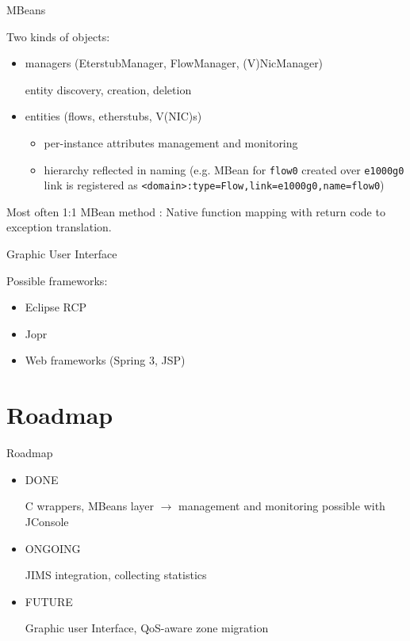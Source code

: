 \documentclass{beamer}
\begin{document}
		\begin{frame}{MBeans}

			Two kinds of objects:
			
			\begin{itemize}

				\item managers (EterstubManager, FlowManager, (V)NicManager)

					entity discovery, creation, deletion

				\item entities (flows, etherstubs, V(NIC)s)

					\begin{itemize}
						\item per-instance attributes management and monitoring
						\item hierarchy reflected in naming (e.g. MBean for \texttt{flow0}
						      created over \texttt{e1000g0} link is registered as \texttt{<domain>:type=Flow,link=e1000g0,name=flow0})
					\end{itemize}
			
			\end{itemize}

			Most often 1:1 MBean method : Native function mapping with return code to exception translation.

		\end{frame}


		\begin{frame}{Graphic User Interface}

				Possible frameworks:

				\begin{itemize}
					\item Eclipse RCP
					\item Jopr
					\item Web frameworks (Spring 3, JSP)
				\end{itemize}

		\end{frame}


\section{Roadmap}

	\begin{frame}{Roadmap}
		
		\begin{itemize}

			\item DONE
			
				C wrappers, MBeans layer $\rightarrow$ management and monitoring possible with JConsole

			\item ONGOING
			
				JIMS integration, collecting statistics

			\item FUTURE
			
				Graphic user Interface, QoS-aware zone migration

		\end{itemize}

	\end{frame}
\end{document}
